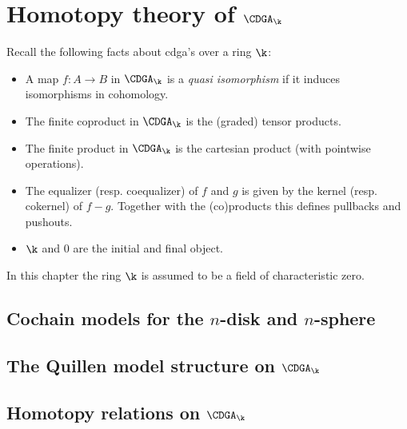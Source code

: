 
\newcommand{\titleCDGA}{\texorpdfstring{$\CDGA_\k$}{CDGA}}
\section{Homotopy theory of \titleCDGA}
\label{sec:model-of-cdga}

Recall the following facts about cdga's over a ring $\k$:
\begin{itemize}
	\item A map $f: A \to B$ in $\CDGA_\k$ is a \emph{quasi isomorphism} if it induces isomorphisms in cohomology.
	\item The finite coproduct in $\CDGA_\k$ is the (graded) tensor products.
	\item The finite product in $\CDGA_\k$ is the cartesian product (with pointwise operations).
	\item The equalizer (resp. coequalizer) of $f$ and $g$ is given by the kernel (resp. cokernel) of $f - g$. Together with the (co)products this defines pullbacks and pushouts.
	\item $\k$ and $0$ are the initial and final object.
\end{itemize}
In this chapter the ring $\k$ is assumed to be a field of characteristic zero.

\subsection{Cochain models for the $n$-disk and $n$-sphere}


\subsection{The Quillen model structure on \titleCDGA}


\subsection{Homotopy relations on \titleCDGA}

